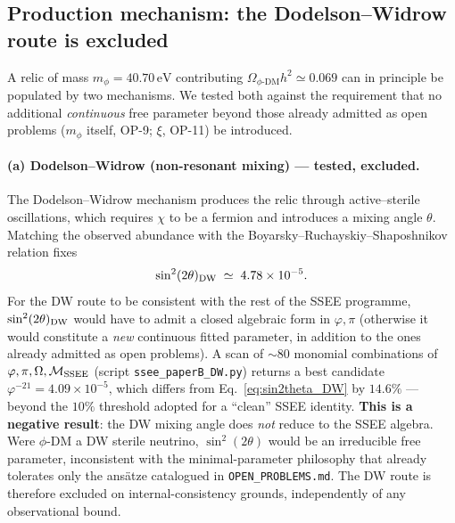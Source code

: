 \documentclass[12pt,a4paper]{article}
\newcommand{\phiDM}{\phi\text{-DM}}
\newcommand{\MIRA}{\mathcal{M}_{\rm SSEE}}
\newcommand{\mphi}{m_\phi}
\begin{document}
\subsection{Production mechanism: the Dodelson--Widrow route is excluded}
\label{subsec:production}

A relic of mass $\mphi = 40.70\,\mathrm{eV}$ contributing
$\Omega_{\phiDM}h^2 \simeq 0.069$ can in principle be populated by two
mechanisms.  We tested both against the requirement that no additional
\emph{continuous} free parameter beyond those already admitted as open problems
($m_\phi$ itself, OP-9; $\xi$, OP-11) be introduced.

\paragraph{(a) Dodelson--Widrow (non-resonant mixing) --- tested, excluded.}
The Dodelson--Widrow mechanism \citep{DodelsonWidrow1994} produces the relic
through active--sterile oscillations, which requires $\chi$ to be a fermion
and introduces a mixing angle $\theta$.  Matching the observed abundance with
the Boyarsky--Ruchayskiy--Shaposhnikov relation \citep{Boyarsky2009} fixes
\begin{equation}
  \sin^2(2\theta)_{\rm DW} \;\simeq\; 4.78\times10^{-5}.
  \label{eq:sin2theta_DW}
\end{equation}
For the DW route to be consistent with the rest of the SSEE programme,
$\sin^2(2\theta)_{\rm DW}$ would have to admit a closed algebraic form in
$\varphi,\pi$ (otherwise it would constitute a \emph{new} continuous fitted
parameter, in addition to the ones already admitted as open problems).
A scan of $\sim 80$ monomial combinations of $\varphi,\pi,\Omega,\MIRA$ (script
\texttt{ssee\_paperB\_DW.py}) returns a best candidate $\varphi^{-21} =
4.09\times10^{-5}$, which differs from Eq.~\eqref{eq:sin2theta_DW} by
$14.6\%$ --- beyond the $10\%$ threshold adopted for a ``clean'' SSEE
identity.  \textbf{This is a negative result}: the DW mixing angle does
\emph{not} reduce to the SSEE algebra.  Were $\phi$-DM a DW sterile neutrino,
$\sin^2(2\theta)$ would be an irreducible free parameter, inconsistent with
the minimal-parameter philosophy that already tolerates only the ans\"atze
catalogued in \texttt{OPEN\_PROBLEMS.md}.  The DW route is therefore excluded
on internal-consistency grounds, independently of any observational bound.
\end{document}
